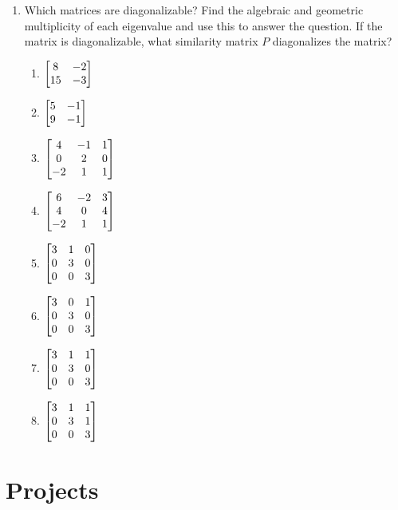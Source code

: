 \begin{enumerate}
\item Which matrices are diagonalizable?  Find the algebraic and geometric multiplicity of each eigenvalue and use this to answer the question.  If the matrix is diagonalizable, what similarity matrix $P$ diagonalizes the matrix?
\begin{multicols}{4}
\begin{enumerate}
	\item 
	$\begin{bmatrix}  
	8 & -2 \\
 	15 & -3
 	 \end{bmatrix}$
	\item 
	$\begin{bmatrix}  
 5 & -1 \\
 9 & -1
 	 \end{bmatrix}$
	\item 
	$\begin{bmatrix}  
 4 & -1 & 1 \\
 0 & 2 & 0 \\
 -2 & 1 & 1
 	 \end{bmatrix}$
	\item 
	$\begin{bmatrix}  
 6 & -2 & 3 \\
 4 & 0 & 4 \\
 -2 & 1 & 1
 	 \end{bmatrix}$
	\item 
	$\begin{bmatrix}  
 3 & 1 & 0 \\
 0 & 3 & 0 \\
 0 & 0 & 3
 	 \end{bmatrix}$
	\item 
	$\begin{bmatrix}  
 3 & 0 & 1 \\
 0 & 3 & 0 \\
 0 & 0 & 3
 	 \end{bmatrix}$
	\item 
	$\begin{bmatrix}  
 3 & 1 & 1 \\
 0 & 3 & 0 \\
 0 & 0 & 3
 	 \end{bmatrix}$
	\item 
	$\begin{bmatrix}  
 3 & 1 & 1 \\
 0 & 3 & 1 \\
 0 & 0 & 3
 	 \end{bmatrix}$
\end{enumerate}
\end{multicols}

\end{enumerate}


\section{Projects}

